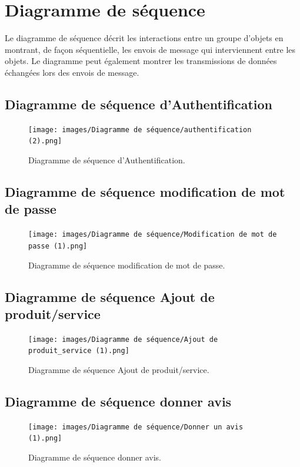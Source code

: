 \section{Diagramme de séquence }
\par Le diagramme de séquence décrit les interactions entre un groupe d'objets
en
montrant, de façon séquentielle, les envois de message qui interviennent entre
les objets. Le diagramme peut également montrer les transmissions de données
échangées lors des envois de message.\cite{ref5}

\subsection{Diagramme de séquence d'Authentification }
\begin{figure}[H]
\centering
\texttt{[image: images/Diagramme de séquence/authentification
(2).png]}
\caption{ Diagramme de séquence d'Authentification.}
\label{fig:my_label}
\end{figure}

\subsection{Diagramme de séquence modification de mot de passe }
\begin{figure}[H]
\centering
\texttt{[image: images/Diagramme de séquence/Modification de mot de
passe (1).png]}
\caption{Diagramme de séquence modification de mot de passe.}
\label{fig:my_label}
\end{figure}

\subsection{Diagramme de séquence Ajout de produit/service }
\begin{figure}[H]
\centering
\texttt{[image: images/Diagramme de séquence/Ajout de
produit\_service (1).png]}
\caption{Diagramme de séquence Ajout de produit/service.}
\label{fig:my_label}
\end{figure}

\subsection{Diagramme de séquence donner avis }
\begin{figure}[H]
\centering
\texttt{[image: images/Diagramme de séquence/Donner un avis
(1).png]}
\caption{Diagramme de séquence donner avis.}
\label{fig:my_label}
\end{figure}